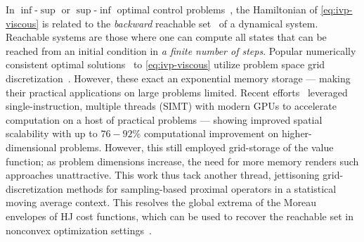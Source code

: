In $\inf$-$\sup$ or $\sup$-$\inf$ optimal control problems~\citet{LygerosReachability}, the Hamiltonian of \eqref{eq:ivp-viscous} is related to the \textit{backward} reachable set~\citet{Mitchell2005} of a dynamical system. Reachable systems are those where one can compute all states that can be reached from an initial condition in \textit{a finite number of steps}. %
%
Popular numerically consistent optimal solutions~\citet{CrandallTwoApprox, CrandallMethodFracSteps} to \eqref{eq:ivp-viscous} utilize problem space grid discretization~\citet{LevelSetsBook, Mitchell2005}. However, these exact an exponential memory storage --- making their practical applications on large problems limited. Recent efforts~\citet{MoluxLevPyCDC, LevelSetTOMS} leveraged single-instruction, multiple threads (SIMT) with modern GPUs to accelerate computation on a host of practical problems --- showing improved spatial scalability with up to $76-92\%$ computational improvement on higher-dimensional problems. However, this still employed grid-storage of the value function; as problem dimensions increase, the need for more memory renders such approaches unattractive. This work thus tack another thread, jettisoning grid-discretization methods for sampling-based proximal operators in a statistical moving average context. This resolves the global extrema of the Moreau envelopes of HJ cost functions, which can be used to recover the reachable set  in nonconvex optimization settings~\citet{HJMAD, HJProx, Chaudhari2018, ChaudhariEntropy}. 

